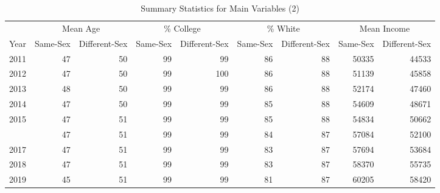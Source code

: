 \begin{table}[htbp]

\caption{Summary Statistics for Main Variables (2)}
\label{var_table_2} %
\centering
\begin{tabular}[t]{rrrrrrrrr}
\toprule
\multicolumn{1}{c}{ } & \multicolumn{2}{c}{Mean Age} & \multicolumn{2}{c}{\% College} & \multicolumn{2}{c}{\% White} & \multicolumn{2}{c}{Mean Income} \\
\cmidrule(l{3pt}r{3pt}){2-3} \cmidrule(l{3pt}r{3pt}){4-5} \cmidrule(l{3pt}r{3pt}){6-7} \cmidrule(l{3pt}r{3pt}){8-9}
Year & Same-Sex & Different-Sex & Same-Sex & Different-Sex & Same-Sex & Different-Sex & Same-Sex & Different-Sex\\
\midrule
2011 & 47 & 50 & 99 & 99 & 86 & 88 & 50335 & 44533\\
2012 & 47 & 50 & 99 & 100 & 86 & 88 & 51139 & 45858\\
2013 & 48 & 50 & 99 & 99 & 86 & 88 & 52174 & 47460\\
2014 & 47 & 50 & 99 & 99 & 85 & 88 & 54609 & 48671\\
2015 & 47 & 51 & 99 & 99 & 85 & 88 & 54834 & 50662\\
\addlinespace
2016 & 47 & 51 & 99 & 99 & 84 & 87 & 57084 & 52100\\
2017 & 47 & 51 & 99 & 99 & 83 & 87 & 57694 & 53684\\
2018 & 47 & 51 & 99 & 99 & 83 & 87 & 58370 & 55735\\
2019 & 45 & 51 & 99 & 99 & 81 & 87 & 60205 & 58420\\
\bottomrule
\end{tabular}
\end{table}
